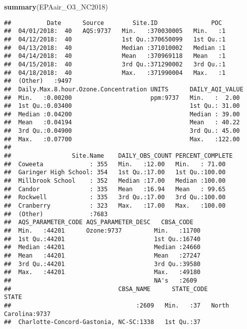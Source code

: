 \documentclass[]{article}
\newenvironment{Shaded}{\begin{snugshade}}{\end{snugshade}}
\newcommand{\KeywordTok}[1]{\textcolor[rgb]{0.13,0.29,0.53}{\textbf{#1}}}
\newcommand{\NormalTok}[1]{#1}
\begin{document}
\begin{Shaded}
\begin{Highlighting}[]
\KeywordTok{summary}\NormalTok{(EPAair_O3_NC2018)}
\end{Highlighting}
\end{Shaded}

\begin{verbatim}
##          Date      Source        Site.ID               POC   
##  04/01/2018:  40   AQS:9737   Min.   :370030005   Min.   :1  
##  04/12/2018:  40              1st Qu.:370650099   1st Qu.:1  
##  04/13/2018:  40              Median :371010002   Median :1  
##  04/14/2018:  40              Mean   :370969118   Mean   :1  
##  04/15/2018:  40              3rd Qu.:371290002   3rd Qu.:1  
##  04/18/2018:  40              Max.   :371990004   Max.   :1  
##  (Other)   :9497                                             
##  Daily.Max.8.hour.Ozone.Concentration UNITS      DAILY_AQI_VALUE 
##  Min.   :0.00200                      ppm:9737   Min.   :  2.00  
##  1st Qu.:0.03400                                 1st Qu.: 31.00  
##  Median :0.04200                                 Median : 39.00  
##  Mean   :0.04194                                 Mean   : 40.22  
##  3rd Qu.:0.04900                                 3rd Qu.: 45.00  
##  Max.   :0.07700                                 Max.   :122.00  
##                                                                  
##                 Site.Name    DAILY_OBS_COUNT PERCENT_COMPLETE
##  Coweeta             : 355   Min.   :12.00   Min.   : 71.00  
##  Garinger High School: 354   1st Qu.:17.00   1st Qu.:100.00  
##  Millbrook School    : 352   Median :17.00   Median :100.00  
##  Candor              : 335   Mean   :16.94   Mean   : 99.65  
##  Rockwell            : 335   3rd Qu.:17.00   3rd Qu.:100.00  
##  Cranberry           : 323   Max.   :17.00   Max.   :100.00  
##  (Other)             :7683                                   
##  AQS_PARAMETER_CODE AQS_PARAMETER_DESC   CBSA_CODE    
##  Min.   :44201      Ozone:9737         Min.   :11700  
##  1st Qu.:44201                         1st Qu.:16740  
##  Median :44201                         Median :24660  
##  Mean   :44201                         Mean   :27247  
##  3rd Qu.:44201                         3rd Qu.:39580  
##  Max.   :44201                         Max.   :49180  
##                                        NA's   :2609   
##                              CBSA_NAME      STATE_CODE            STATE     
##                                   :2609   Min.   :37   North Carolina:9737  
##  Charlotte-Concord-Gastonia, NC-SC:1338   1st Qu.:37                        

\end{verbatim}
\end{document}
